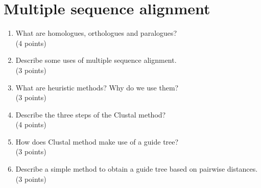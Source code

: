 \documentclass[11pt]{article}
\begin{document}
\section{Multiple sequence alignment}
\begin{enumerate}
\item What are homologues, orthologues and paralogues?\\
  (4 points)
\item Describe some uses of multiple sequence alignment.\\
  (3 points)
\item What are heuristic methods? Why do we use them?\\
  (3 points)
\item Describe the three steps of the Clustal method?\\
  (4 points)
\item How does Clustal method make use of a guide tree?\\
  (3 points)
\item Describe a simple method to obtain a guide tree based on pairwise
  distances.\\
  (3 points)
  
\end{enumerate}
\end{document}
